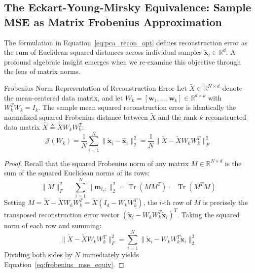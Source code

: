 \subsection{The Eckart-Young-Mirsky Equivalence: Sample MSE as Matrix Frobenius Approximation}
The formulation in Equation~\eqref{eq:pca_recon_opt} defines reconstruction error as the sum of Euclidean squared distances across individual samples $\tilde{\mathbf{x}}_i \in \mathbb{R}^d$. A profound algebraic insight emerges when we re-examine this objective through the lens of matrix norms.

\begin{theorembox}{Frobenius Norm Representation of Reconstruction Error}
Let $\tilde{X} \in \mathbb{R}^{N \times d}$ denote the mean-centered data matrix, and let $W_k = [\mathbf{w}_1, \dots, \mathbf{w}_k] \in \mathbb{R}^{d \times k}$ with $W_k^T W_k = I_k$. The sample mean squared reconstruction error is identically the normalized squared Frobenius distance between $\tilde{X}$ and the rank-$k$ reconstructed data matrix $\hat{X} \triangleq \tilde{X} W_k W_k^T$:
\begin{equation}
\mathcal{J}(W_k) = \frac{1}{N}\sum_{i=1}^N \|\tilde{\mathbf{x}}_i - \hat{\mathbf{x}}_i\|_2^2 = \frac{1}{N} \|\tilde{X} - \tilde{X} W_k W_k^T\|_F^2
\label{eq:frobenius_mse_equiv}
\end{equation}
\end{theorembox}

\begin{proof}
Recall that the squared Frobenius norm of any matrix $M \in \mathbb{R}^{N \times d}$ is the sum of the squared Euclidean norms of its rows:
\begin{equation}
\|M\|_F^2 = \sum_{i=1}^N \|\mathbf{m}_{i,:}\|_2^2 = \operatorname{Tr}(M M^T) = \operatorname{Tr}(M^T M)
\end{equation}
Setting $M = \tilde{X} - \tilde{X} W_k W_k^T = \tilde{X} (I_d - W_k W_k^T)$, the $i$-th row of $M$ is precisely the transposed reconstruction error vector $(\tilde{\mathbf{x}}_i - W_k W_k^T \tilde{\mathbf{x}}_i)^T$. Taking the squared norm of each row and summing:
\begin{equation}
\|\tilde{X} - \tilde{X} W_k W_k^T\|_F^2 = \sum_{i=1}^N \|\tilde{\mathbf{x}}_i - W_k W_k^T \tilde{\mathbf{x}}_i\|_2^2
\end{equation}
Dividing both sides by $N$ immediately yields Equation~\eqref{eq:frobenius_mse_equiv}.
\end{proof}

